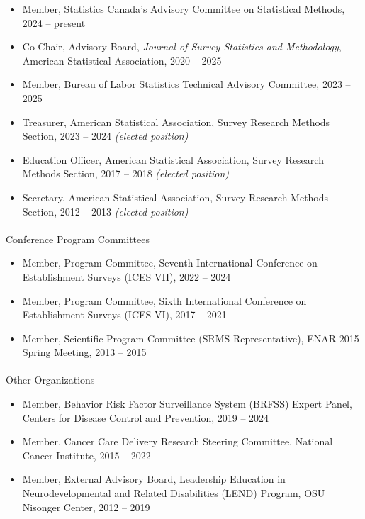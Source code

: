 \documentclass[
  english,
  letterpaper,
  DIV=11,
  numbers=noendperiod]{scrartcl}
\makeatletter
\let\oldparagraph\paragraph
\renewcommand{\paragraph}{
    \@ifstar
      \xxxParagraphStar
      \xxxParagraphNoStar
  }
\newcommand{\xxxParagraphStar}[1]{\oldparagraph*{#1}\mbox{}}
\newcommand{\xxxParagraphNoStar}[1]{\oldparagraph{#1}\mbox{}}
\providecommand{\tightlist}{%
  \setlength{\itemsep}{0pt}\setlength{\parskip}{0pt}}
\makeatother
\begin{document}
\begin{itemize}
\tightlist
\item
  Member, Statistics Canada's Advisory Committee on Statistical Methods,
  2024 -- present\\
\item
  Co-Chair, Advisory Board, \emph{Journal of Survey Statistics and
  Methodology}, American Statistical Association, 2020 -- 2025\\
\item
  Member, Bureau of Labor Statistics Technical Advisory Committee, 2023
  -- 2025\\
\item
  Treasurer, American Statistical Association, Survey Research Methods
  Section, 2023 -- 2024 \emph{(elected position)}
\item
  Education Officer, American Statistical Association, Survey Research
  Methods Section, 2017 -- 2018 \emph{(elected position)}
\item
  Secretary, American Statistical Association, Survey Research Methods
  Section, 2012 -- 2013 \emph{(elected position)}
\end{itemize}

\paragraph{Conference Program
Committees}\label{conference-program-committees}

\begin{itemize}
\tightlist
\item
  Member, Program Committee, Seventh International Conference on
  Establishment Surveys (ICES VII), 2022 -- 2024\\
\item
  Member, Program Committee, Sixth International Conference on
  Establishment Surveys (ICES VI), 2017 -- 2021\\
\item
  Member, Scientific Program Committee (SRMS Representative), ENAR 2015
  Spring Meeting, 2013 -- 2015
\end{itemize}

\paragraph{Other Organizations}\label{other-organizations}

\begin{itemize}
\tightlist
\item
  Member, Behavior Risk Factor Surveillance System (BRFSS) Expert Panel,
  Centers for Disease Control and Prevention, 2019 -- 2024\\
\item
  Member, Cancer Care Delivery Research Steering Committee, National
  Cancer Institute, 2015 -- 2022\\
\item
  Member, External Advisory Board, Leadership Education in
  Neurodevelopmental and Related Disabilities (LEND) Program, OSU
  Nisonger Center, 2012 -- 2019
\end{itemize}
\end{document}
